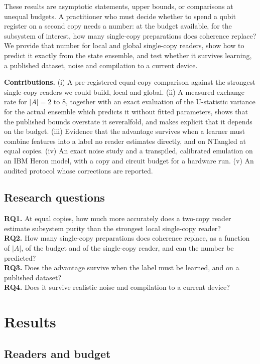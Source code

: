 \documentclass[11pt,a4paper]{article}
\begin{document}
These results are asymptotic statements, upper bounds, or comparisons at unequal budgets. A
practitioner who must decide whether to spend a qubit register on a second copy needs a number: at
the budget available, for the subsystem of interest, how many single-copy preparations does
coherence replace? We provide that number for local and global single-copy readers, show how to
predict it exactly from the state ensemble, and test whether it survives learning, a published
dataset, noise and compilation to a current device.

\textbf{Contributions.} (i) A pre-registered equal-copy comparison against the strongest
single-copy readers we could build, local and global. (ii) A measured exchange rate for $|A|=2$ to
$8$, together with an exact evaluation of the U-statistic variance for the actual ensemble which
predicts it without fitted parameters, shows that the published bounds overstate it severalfold, and
makes explicit that it depends on the budget. (iii) Evidence that the advantage survives when a
learner must combine features into a label no reader estimates directly, and on NTangled at equal
copies. (iv) An exact noise study and a transpiled, calibrated emulation on an IBM Heron model, with a
copy and circuit budget for a hardware run. (v) An audited protocol whose corrections are reported.

\subsection*{Research questions}
\textbf{RQ1.} At equal copies, how much more accurately does a two-copy reader estimate subsystem
purity than the strongest local single-copy reader?\\
\textbf{RQ2.} How many single-copy preparations does coherence replace, as a function of $|A|$, of
the budget and of the single-copy reader, and can the number be predicted?\\
\textbf{RQ3.} Does the advantage survive when the label must be learned, and on a published
dataset?\\
\textbf{RQ4.} Does it survive realistic noise and compilation to a current device?

\section{Results}

\subsection{Readers and budget}
\end{document}
